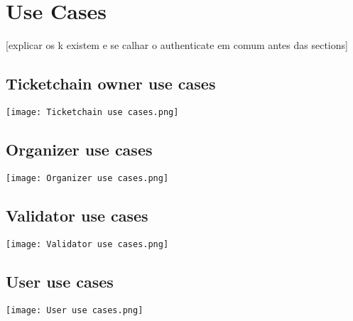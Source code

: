 \section{Use Cases}





 [explicar os k existem e se calhar o authenticate em comum antes das sections]

\subsection{Ticketchain owner use cases}

\texttt{[image: Ticketchain use cases.png]}

\subsection{Organizer use cases}

\texttt{[image: Organizer use cases.png]}

\subsection{Validator use cases}

\texttt{[image: Validator use cases.png]}

\subsection{User use cases}

\texttt{[image: User use cases.png]}
